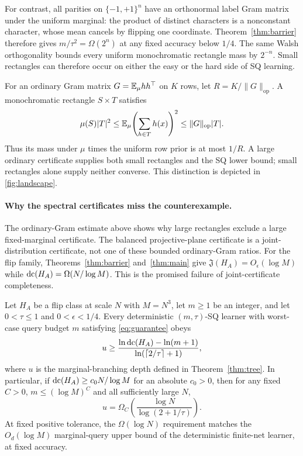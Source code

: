 For contrast, all parities on $\{-1,+1\}^n$ have an orthonormal label Gram matrix under the uniform marginal: the product of distinct characters is a nonconstant character, whose mean cancels by flipping one coordinate. Theorem~\ref{thm:barrier} therefore gives $m/\tau^2=\Omega(2^n)$ at any fixed accuracy below $1/4$. The same Walsh orthogonality bounds every uniform monochromatic rectangle mass by $2^{-n}$. Small rectangles can therefore occur on either the easy or the hard side of SQ learning.

For an ordinary Gram matrix $G=\mathbb E_\mu hh^\top$ on $K$ rows, let $R=K/\|G\|_{\mathrm{op}}$. A monochromatic rectangle $S\times T$ satisfies
\[
 \mu(S)|T|^2\le\mathbb E_\mu\!\left(\sum_{h\in T}h(x)\right)^2
 \le\|G\|_{\mathrm{op}}|T|.
\]
Thus its mass under $\mu$ times the uniform row prior is at most $1/R$. A large ordinary certificate supplies both small rectangles and the SQ lower bound; small rectangles alone supply neither converse. This distinction is depicted in \cref{fig:landscape}.



\paragraph{Why the spectral certificates miss the counterexample.}
The ordinary-Gram estimate above shows why large rectangles exclude a large fixed-marginal certificate. The balanced projective-plane certificate is a joint-distribution certificate, not one of these bounded ordinary-Gram ratios. For the flip family, Theorems~\ref{thm:barrier} and~\ref{thm:main} give $\mathfrak J(H_A)=O_\epsilon(\log M)$ while $\operatorname{dc}(H_A)=\Omega(N/\log M)$. This is the promised failure of joint-certificate completeness.


\begin{theorem}\label{thm:adapt}
Let $H_A$ be a flip class at scale $N$ with $M=N^3$, let $m\ge1$ be an integer, and let $0<\tau\le1$ and $0<\epsilon<1/4$. Every deterministic $(m,\tau)$-SQ learner with worst-case query budget $m$ satisfying \eqref{eq:guarantee} obeys
\[
 u\ge\frac{\ln\operatorname{dc}(H_A)-\ln(m+1)}
 {\ln(\lceil2/\tau\rceil+1)},
\]
where $u$ is the marginal-branching depth defined in Theorem~\ref{thm:tree}. In particular, if $\operatorname{dc}(H_A)\ge c_0N/\log M$ for an absolute $c_0>0$, then for any fixed $C>0$, $m\le(\log M)^C$ and all sufficiently large $N$,
\[
 u=\Omega_C\!\left(\frac{\log N}{\log(2+1/\tau)}\right).
\]
At fixed positive tolerance, the $\Omega(\log N)$ requirement matches the $O_d(\log M)$ marginal-query upper bound of the deterministic finite-net learner, at fixed accuracy.
\end{theorem}

